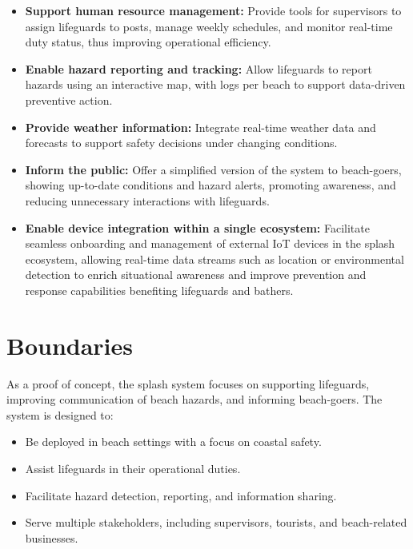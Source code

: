 \begin{itemize}
    \item \textbf{Support human resource management:} Provide tools for supervisors to assign lifeguards to posts, manage weekly schedules, and monitor real-time duty status, thus improving operational efficiency.
    
    \item \textbf{Enable hazard reporting and tracking:} Allow lifeguards to report hazards using an interactive map, with logs per beach to support data-driven preventive action.
    
    \item \textbf{Provide weather information:} Integrate real-time weather data and forecasts to support safety decisions under changing conditions.
    
    \item \textbf{Inform the public:} Offer a simplified version of the system to beach-goers, showing up-to-date conditions and hazard alerts, promoting awareness, and reducing unnecessary interactions with lifeguards.

    \item \textbf{Enable device integration within a single ecosystem:} Facilitate seamless onboarding and management of external IoT devices in the \ac{splash} ecosystem, allowing real-time data streams such as location or environmental detection to enrich situational awareness and improve prevention and response capabilities benefiting lifeguards and bathers.

\end{itemize}

\section{Boundaries}
\label{section:boundaries}

As a proof of concept, the \ac{splash} system focuses on supporting lifeguards, improving communication of beach hazards, and informing beach-goers. The system is designed to:

\begin{itemize}
    \item Be deployed in beach settings with a focus on coastal safety.
    \item Assist lifeguards in their operational duties.
    \item Facilitate hazard detection, reporting, and information sharing.
    \item Serve multiple stakeholders, including supervisors, tourists, and beach-related businesses.
\end{itemize}

